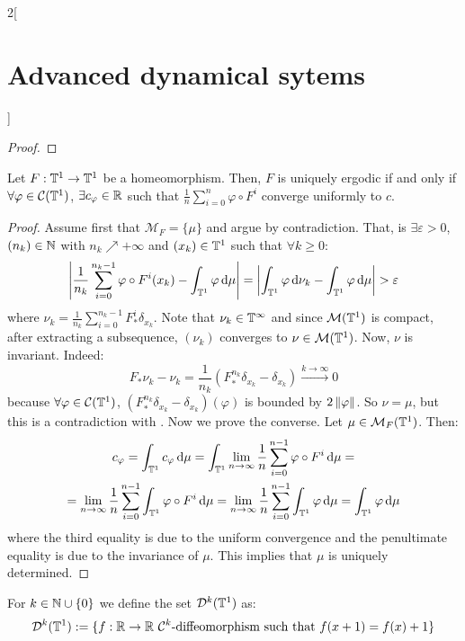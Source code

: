 \documentclass[../../../main_math.tex]{subfiles}
\begin{document}
\begin{multicols}{2}[\section{Advanced dynamical sytems}]
\begin{proof}
  \end{proof}
  \begin{proposition}
    Let $F:\mathbb{T}^1\to\mathbb{T}^1$ be a homeomorphism. Then, $F$ is uniquely ergodic if and only if $\forall \varphi\in\mathcal{C}(\mathbb{T}^1)$, $\exists c_\varphi\in\mathbb{R}$ such that $\frac{1}{n}\sum_{i=0}^n\varphi\circ F^i$ converge uniformly to $c$.
  \end{proposition}
  \begin{proof}
    Assume first that $\mathcal{M}_F=\{\mu\}$ and argue by contradiction. That, is $\exists \varepsilon>0$, $(n_k)\in\mathbb{N}$ with $n_k\nearrow +\infty$ and $(x_k)\in\mathbb{T}^1$ such that $\forall k\geq 0$:
    \begin{equation}\label{ADS:nuk_mu}
      \abs{\frac{1}{n_k}\sum_{i=0}^{n_k-1}\varphi\circ F^i(x_k)-\int_{\mathbb{T}^1}\varphi\dd{\mu}}=\abs{\int_{\mathbb{T}^1}\varphi\dd{\nu_k}-\int_{\mathbb{T}^1}\varphi\dd{\mu}}>\varepsilon
    \end{equation}
    $$
    $$
    where $\nu_k=\frac{1}{n_k}\sum_{i=0}^{n_k-1}F_*^i\delta_{x_k}$. Note that $\nu_k\in\mathcal{\mathbb{T}^1}$ and since $\mathcal{M}(\mathbb{T}^1)$ is compact, after extracting a subsequence, $(\nu_k)$ converges to $\nu\in\mathcal{M}(\mathbb{T}^1)$. Now, $\nu$ is invariant. Indeed:
    $$
      F_*\nu_k-\nu_k=\frac{1}{n_k}(F_*^{n_k}\delta_{x_k}-\delta_{x_k})\overset{k\to\infty}{\longrightarrow} 0
    $$
    because $\forall \varphi\in\mathcal{C}(\mathbb{T}^1)$, $(F_*^{n_k}\delta_{x_k}-\delta_{x_k})(\varphi)$ is bounded by $2\left\|\varphi\right\|$. So $\nu =\mu$, but this is a contradiction with . Now we prove the converse. Let $\mu\in\mathcal{M}_F(\mathbb{T}^1)$. Then:
    \begin{multline*}
      c_\varphi =\int_{\mathbb{T}^1}c_\varphi\dd{\mu} =\int_{\mathbb{T}^1}\lim_{n\to\infty}\frac{1}{n}\sum_{i=0}^{n-1}\varphi\circ F^i\dd{\mu} =\\
      =\lim_{n\to\infty}\frac{1}{n}\sum_{i=0}^{n-1}\int_{\mathbb{T}^1}\varphi\circ F^i\dd{\mu}=\lim_{n\to\infty}\frac{1}{n}\sum_{i=0}^{n-1}\int_{\mathbb{T}^1}\varphi\dd{\mu} =\int_{\mathbb{T}^1}\varphi\dd{\mu}
    \end{multline*}
    where the third equality is due to the uniform convergence and the penultimate equality is due to the invariance of $\mu$. This implies that $\mu$ is uniquely determined.
  \end{proof}
  \begin{definition}
    For $k\in\mathbb{N}\cup\{0\}$ we define the set $\mathcal{D}^k(\mathbb{T}^1)$ as:
    $$
      \mathcal{D}^k(\mathbb{T}^1):=\{f:\mathbb{R}\to\mathbb{R} \text{ $\mathcal{C}^k$-diffeomorphism such that }f(x+1)=f(x)+1\}
$$
\end{definition}
\end{multicols}
\end{document}
